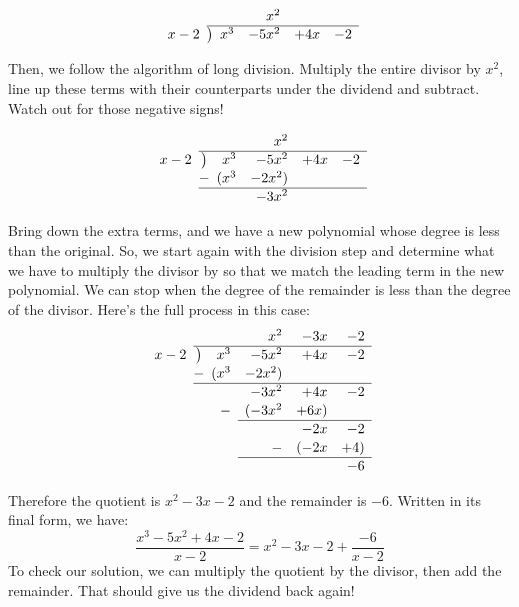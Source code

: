 \[
\renewcommand\arraystretch{1.1}
\begin{array}{*1r @{\hskip\arraycolsep}c@{\hskip\arraycolsep} *4r}
		&	~	&&x^2&\\
\cline{2-6}
x-2		&\big)	&x^3&-5x^2&+4x&-2\\
\end{array}
\]

Then, we follow the algorithm of long division. Multiply the entire divisor by $x^2$, line up these terms with their counterparts under the dividend and subtract. Watch out for those negative signs!

\[
\renewcommand\arraystretch{1.1}
\begin{array}{*1r @{\hskip\arraycolsep}c@{\hskip\arraycolsep} *4r}
		&	~	&&x^2&\\
\cline{2-6}
x-2		&\big)	&x^3&-5x^2&+4x&-2\\
		&-		&(x^3&-2x^2)\\
\cline{2-6}
		&		&~	&-3x^2\\
\end{array}
\]

Bring down the extra terms, and we have a new polynomial whose degree is less than the original. So, we start again with the division step and determine what we have to multiply the divisor by so that we match the leading term in the new polynomial. We can stop when the degree of the remainder is less than the degree of the divisor. Here's the full process in this case:
\[
\renewcommand\arraystretch{1.1}
\begin{array}{*1r @{\hskip\arraycolsep}c@{\hskip\arraycolsep} *4r}
		&	~	&&x^2&-3x&-2\\
\cline{2-6}
x-2		&\big)	&x^3&-5x^2&+4x&-2\\
		&-		&(x^3&-2x^2)\\
\cline{2-6}
		&		&~	&-3x^2&+4x&-2\\
		&		&-	&(-3x^2&+6x)&\\
\cline{4-6}
		&		&&	&-2x&-2\\
		&		&&-	&(-2x&+4)\\
\cline{4-6}
		&		&&		&&-6
\end{array}
\]

Therefore the quotient is $x^2-3x-2$ and the remainder is $-6$. Written in its final form, we have:
\[\frac{x^3-5x^2+4x-2}{x-2} = x^2-3x-2+\frac{-6}{x-2}\]
To check our solution, we can multiply the quotient by the divisor, then add the remainder. That should give us the dividend back again!


